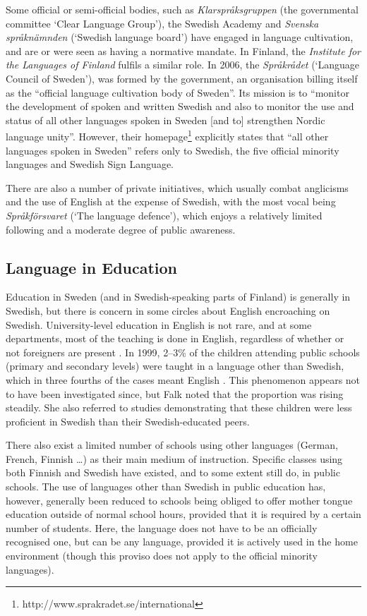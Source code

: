\begin{multicols}{2}
Some official or semi-official bodies, such as
\textit{Klarspråksgruppen} (the governmental committee ‘Clear Language
Group’), the Swedish Academy and \textit{Svenska språknämnden}
(`Swedish language board') have engaged in language cultivation, and
are or were seen as having a normative mandate. In Finland, the
\textit{Institute for the Languages of Finland} fulfils a similar
role. In 2006, the \textit{Språkrådet} (`Language Council of Sweden'),
was formed by the government, an organisation billing itself as the
``official language cultivation body of Sweden''. Its mission is to
``monitor the development of spoken and written Swedish and also to
monitor the use and status of all other languages spoken in Sweden
[and to] strengthen Nordic language unity''. However, their
homepage\footnote{http://www.sprakradet.se/international} explicitly
states that ``all other languages spoken in Sweden'' refers only to
Swedish, the five official minority languages and Swedish Sign
Language.

There are also a number of private initiatives, which usually combat
anglicisms and the use of English at the expense of Swedish, with the
most vocal being \textit{Språkförsvaret} (`The language defence'),
which enjoys a relatively limited following and a moderate degree of
public awareness.

\subsection{Language in Education}

Education in Sweden (and in Swedish-speaking parts of Finland) is
generally in Swedish, but there is concern in some circles about
English encroaching on Swedish. University-level education in English
is not rare, and at some departments, most of the teaching is done in
English, regardless of whether or not foreigners are present
\cite[25,~29f]{falk2001}. In 1999, 2--3\% of the children attending
public schools (primary and secondary levels) were taught in a
language other than Swedish, which in three fourths of the cases meant
English \cite[18f]{falk2001}. This phenomenon appears not to have been
investigated since, but Falk noted that the proportion was rising
steadily. She also referred to studies \cite[19]{falk2001}
demonstrating that these children were less proficient in Swedish than
their Swedish-educated peers.

There also exist a limited number of schools using other languages
(German, French, Finnish \ldots) as their main medium of
instruction. Specific classes using both Finnish and Swedish have
existed, and to some extent still do, in public schools. The use of
languages other than Swedish in public education has, however,
generally been reduced to schools being obliged to offer mother tongue
education outside of normal school hours, provided that it is required
by a certain number of students. Here, the language does not have to
be an officially recognised one, but can be any language, provided it
is actively used in the home environment (though this proviso does not
apply to the official minority languages).


\end{multicols}
